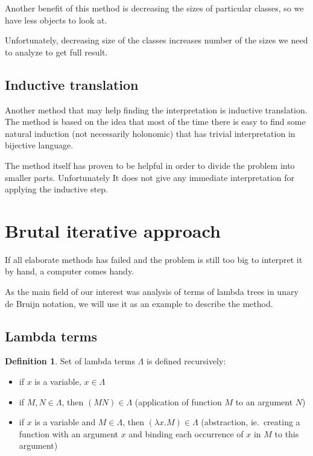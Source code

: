 \documentclass[final]{article}
\theoremstyle{definition}
\newtheorem{definition}{Definition}[subsection]
\theoremstyle{remark}
\begin{document}
Another benefit of this method is decreasing the sizes of particular classes, so we have less objects to look at.

Unfortunately, decreasing size of the classes increases number of the sizes we need to analyze to get full result.


\subsection{Inductive translation}%
\label{sub:inductive_translation}

Another method that may help finding the interpretation is inductive translation\cite{doron}. The method is based on the idea that most of the time there is easy to find some natural induction (not necessarily holonomic) that has trivial interpretation in bijective language.


The method itself has proven to be helpful in order to divide the problem into smaller parts. Unfortunately It does not give any immediate interpretation for applying the inductive step.

\section{Brutal iterative approach}%
\label{sec:brutal_iterative_approach}

If all elaborate methods has failed and the problem is still too big to interpret it by hand, a computer comes handy.

As the main field of our interest was analysis of terms of lambda trees in unary de Bruijn notation, we will use it as an example to describe the method.

\subsection{Lambda terms}%
\label{sub:lambda_terms}

\begin{definition}
    Set of lambda terms \(\Lambda\) is defined recursively:
    \begin{itemize}
        \item if \(x\) is a variable, \(x \in \Lambda\)
        \item if \(M, N \in \Lambda\), then \((M N) \in \Lambda\) (application of function \(M\) to an argument \(N\))
        \item if \(x\) is a variable and \(M \in \Lambda\), then \((\lambda x . M) \in \Lambda\) (abstraction, ie.\ creating a function with an argument \(x\) and binding each occurrence of \(x\) in \(M\) to this argument)
    \end{itemize}
\end{definition}
\end{document}
